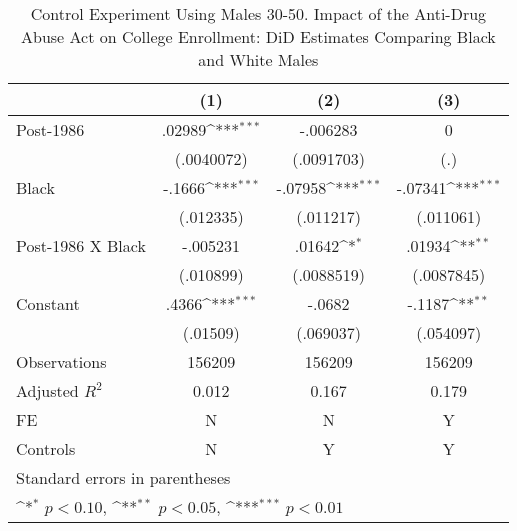 \begin{table}[htbp]\centering
\def\sym#1{\ifmmode^{#1}\else\(^{#1}\)\fi}
\caption{Control Experiment Using Males 30-50. Impact of the Anti-Drug Abuse Act on College Enrollment: DiD Estimates Comparing Black and White Males}
\begin{tabular}{l*{3}{c}}
\hline\hline
                    &\multicolumn{1}{c}{(1)}         &\multicolumn{1}{c}{(2)}         &\multicolumn{1}{c}{(3)}         \\
\hline
Post-1986           &      .02989\sym{***}&    -.006283         &           0         \\
                    &  (.0040072)         &  (.0091703)         &         (.)         \\
[1em]
Black               &      -.1666\sym{***}&     -.07958\sym{***}&     -.07341\sym{***}\\
                    &   (.012335)         &   (.011217)         &   (.011061)         \\
[1em]
Post-1986 X Black   &    -.005231         &      .01642\sym{*}  &      .01934\sym{**} \\
                    &   (.010899)         &  (.0088519)         &  (.0087845)         \\
[1em]
Constant            &       .4366\sym{***}&      -.0682         &      -.1187\sym{**} \\
                    &    (.01509)         &   (.069037)         &   (.054097)         \\
\hline
Observations        &      156209         &      156209         &      156209         \\
Adjusted \(R^{2}\)  &       0.012         &       0.167         &       0.179         \\
FE                  &           N         &           N         &           Y         \\
Controls            &           N         &           Y         &           Y         \\
\hline\hline
\multicolumn{4}{l}{\footnotesize Standard errors in parentheses}\\
\multicolumn{4}{l}{\footnotesize \sym{*} \(p<0.10\), \sym{**} \(p<0.05\), \sym{***} \(p<0.01\)}\\
\end{tabular}
\end{table}
